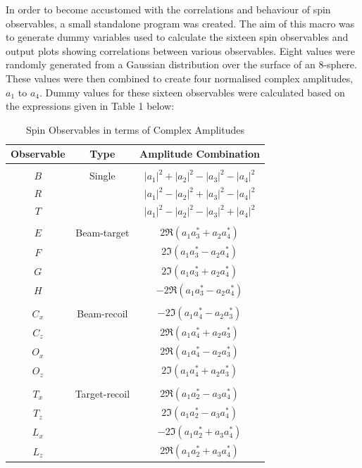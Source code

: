 \documentclass[a4paper,12pt]{article}
\begin{document}
In order to become accustomed with the correlations and behaviour of spin observables, a small standalone program was created.  The aim of this macro was to generate dummy variables used to calculate the sixteen spin observables and output plots showing correlations between various observables.
\newline
Eight values were randomly generated from a Gaussian distribution over the surface of an 8-sphere.  These values were then combined to create four normalised complex amplitudes, $a_{1}$ to $a_{4}$.  Dummy values for these sixteen observables were calculated based on the expressions given in Table 1 below:
\newline
  \begin{center}
  \begin{table}[!h]
  \caption{Spin Observables in terms of Complex Amplitudes\cite{info}}
  \centering
  \begin{tabular}{c  c  c}
  \hline \hline
  Observable & Type & Amplitude Combination \\ [0.5ex]
  \hline \\
  $B$ & Single & $|a_{1}|^{2} + |a_{2}|^{2} - |a_{3}|^{2} - |a_{4}|^{2}$ \\
  $R$ & & $|a_{1}|^{2} - |a_{2}|^{2} + |a_{3}|^{2} - |a_{4}|^{2}$ \\
  $T$ & & $|a_{1}|^{2} - |a_{2}|^{2} - |a_{3}|^{2} + |a_{4}|^{2}$ \\ \\
  $E$ & Beam-target & $2\Re(a_{1}a_{3}^{*} + a_{2}a_{4}^{*})$ \\
  $F$ & & $2\Im(a_{1}a_{3}^{*} - a_{2}a_{4}^{*})$ \\ 
  $G$ & & $2\Im(a_{1}a_{3}^{*} + a_{2}a_{4}^{*})$ \\ 
  $H$ & & $-2\Re(a_{1}a_{3}^{*} - a_{2}a_{4}^{*})$ \\ \\
  $C_{x}$ & Beam-recoil & $-2\Im(a_{1}a_{4}^{*} - a_{2}a_{3}^{*})$ \\
  $C_{z}$ & & $2\Re(a_{1}a_{4}^{*} + a_{2}a_{3}^{*})$ \\
  $O_{x}$ & & $2\Re(a_{1}a_{4}^{*} - a_{2}a_{3}^{*})$ \\
  $O_{z}$ & & $2\Im(a_{1}a_{4}^{*} + a_{2}a_{3}^{*})$ \\ \\
  $T_{x}$ & Target-recoil & $2\Re(a_{1}a_{2}^{*} - a_{3}a_{4}^{*})$ \\
  $T_{z}$ & & $2\Im(a_{1}a_{2}^{*} - a_{3}a_{4}^{*})$ \\
  $L_{x}$ & & $-2\Im(a_{1}a_{2}^{*} + a_{3}a_{4}^{*})$ \\
  $L_{z}$ & & $2\Re(a_{1}a_{2}^{*} + a_{3}a_{4}^{*})$ \\ [1ex]
  \hline
  \end{tabular}

  \end{table}
  \end{center}
\end{document}
